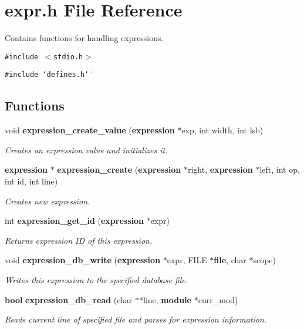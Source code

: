 \section{expr.h File Reference}
\label{expr_8h}
Contains functions for handling expressions. 


{\tt \#include $<$stdio.h$>$}\par
{\tt \#include \char`\"{}defines.h\char`\"{}}\par
\subsection*{Functions}
\begin{CompactItemize}
\item 
void {\bf expression\_\-create\_\-value} ({\bf expression} $\ast$exp, int width, int lsb)
\begin{CompactList}\small\item\em Creates an expression value and initializes it.\item\end{CompactList}\item 
{\bf expression} $\ast$ {\bf expression\_\-create} ({\bf expression} $\ast$right, {\bf expression} $\ast$left, int op, int id, int line)
\begin{CompactList}\small\item\em Creates new expression.\item\end{CompactList}\item 
int {\bf expression\_\-get\_\-id} ({\bf expression} $\ast$expr)
\begin{CompactList}\small\item\em Returns expression ID of this expression.\item\end{CompactList}\item 
void {\bf expression\_\-db\_\-write} ({\bf expression} $\ast$expr, FILE $\ast${\bf file}, char $\ast$scope)
\begin{CompactList}\small\item\em Writes this expression to the specified database file.\item\end{CompactList}\item 
{\bf bool} {\bf expression\_\-db\_\-read} (char $\ast$$\ast$line, {\bf module} $\ast$curr\_\-mod)
\begin{CompactList}\small\item\em Reads current line of specified file and parses for expression information.\item\end{CompactList}\item 
$$
\end{CompactItemize}
